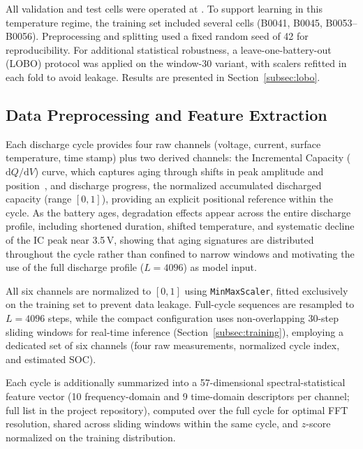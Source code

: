 All validation and test cells were operated at . To support learning in
this temperature regime, the training set included several  cells
(B0041, B0045, B0053--B0056). Preprocessing and splitting used a fixed random
seed of 42 for reproducibility. For additional statistical robustness, a
leave-one-battery-out (LOBO) protocol was applied on the window-30 variant, with
scalers refitted in each fold to avoid leakage. Results are presented in
Section~\ref{subsec:lobo}.

\subsection{Data Preprocessing and Feature Extraction}
\label{subsec:preprocessing}

Each discharge cycle provides four raw channels (voltage, current, surface
temperature, time stamp) plus two derived channels: the Incremental Capacity
($\mathrm{d}Q/\mathrm{d}V$) curve, which captures aging through shifts in peak
amplitude and position~\cite{weng2016}, and discharge progress, the normalized
accumulated discharged capacity (range $[0, 1]$), providing an explicit
positional reference within the cycle. As the battery ages, degradation effects
appear across the entire discharge profile, including shortened duration,
shifted temperature, and systematic decline of the IC peak near 3.5\,V, showing
that aging signatures are distributed throughout the cycle rather than confined
to narrow windows and motivating the use of the full discharge profile
($L = 4096$) as model input.

All six channels are normalized to $[0, 1]$ using \texttt{MinMaxScaler}, fitted
exclusively on the training set to prevent data leakage. Full-cycle sequences
are resampled to $L = 4096$ steps, while the compact configuration uses
non-overlapping 30-step sliding windows for real-time inference
(Section~\ref{subsec:training}), employing a dedicated set of six channels (four
raw measurements, normalized cycle index, and estimated SOC).

Each cycle is additionally summarized into a 57-dimensional
spectral-statistical feature vector (10 frequency-domain and 9 time-domain
descriptors per channel; full list in the project repository), computed over the
full cycle for optimal FFT resolution, shared across sliding windows within the
same cycle, and $z$-score normalized on the training distribution.

